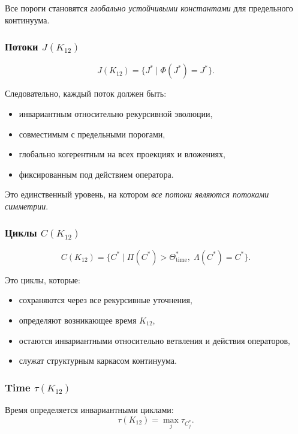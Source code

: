 Все пороги становятся \emph{глобально устойчивыми константами} для
предельного континуума.

\subsubsection{Потоки $J(K_{12})$}

\[
J(K_{12}) = \{J^*\mid \Phi(J^*)=J^*\}.
\]

Следовательно, каждый поток должен быть:
\begin{itemize}
    \item инвариантным относительно рекурсивной эволюции,
    \item совместимым с предельными порогами,
    \item глобально когерентным на всех проекциях и вложениях,
    \item фиксированным под действием оператора.
\end{itemize}

Это единственный уровень, на котором \emph{все потоки являются потоками
симметрии}.

\subsubsection{Циклы $C(K_{12})$}

\[
C(K_{12}) = \{ C^*\mid \Pi(C^*)>\Theta_{\mathrm{time}}^*,\;
\Lambda(C^*)=C^*\}.
\]

Это циклы, которые:
\begin{itemize}
    \item сохраняются через все рекурсивные уточнения,
    \item определяют возникающее время $K_{12}$,
    \item остаются инвариантными относительно ветвления и действия операторов,
    \item служат структурным каркасом континуума.
\end{itemize}

\subsubsection{Time $\tau(K_{12})$}

Время определяется инвариантными циклами:
\[
\tau(K_{12}) = \max_j \tau_{C_j^*}.
\]

